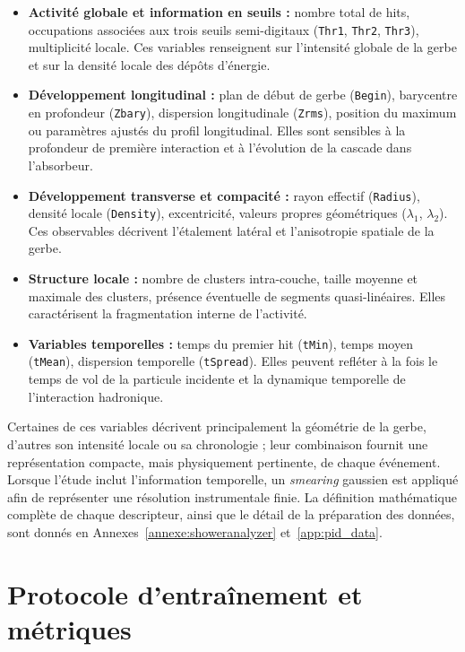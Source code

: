 \begin{itemize}
    \item \textbf{Activité globale et information en seuils :} nombre total de hits, occupations associées aux trois seuils semi-digitaux (\texttt{Thr1}, \texttt{Thr2}, \texttt{Thr3}), multiplicité locale. Ces variables renseignent sur l'intensité globale de la gerbe et sur la densité locale des dépôts d'énergie.

    \item \textbf{Développement longitudinal :} plan de début de gerbe (\texttt{Begin}), barycentre en profondeur (\texttt{Zbary}), dispersion longitudinale (\texttt{Zrms}), position du maximum ou paramètres ajustés du profil longitudinal. Elles sont sensibles à la profondeur de première interaction et à l'évolution de la cascade dans l'absorbeur.

    \item \textbf{Développement transverse et compacité :} rayon effectif (\texttt{Radius}), densité locale (\texttt{Density}), excentricité, valeurs propres géométriques (\(\lambda_1\), \(\lambda_2\)). Ces observables décrivent l'étalement latéral et l'anisotropie spatiale de la gerbe.

    \item \textbf{Structure locale :} nombre de clusters intra-couche, taille moyenne et maximale des clusters, présence éventuelle de segments quasi-linéaires. Elles caractérisent la fragmentation interne de l'activité.

    \item \textbf{Variables temporelles :} temps du premier hit (\texttt{tMin}), temps moyen (\texttt{tMean}), dispersion temporelle (\texttt{tSpread}). Elles peuvent refléter à la fois le temps de vol de la particule incidente et la dynamique temporelle de l'interaction hadronique.
\end{itemize}

Certaines de ces variables décrivent principalement la géométrie de la gerbe, d'autres son intensité locale ou sa chronologie ; leur combinaison fournit une représentation compacte, mais physiquement pertinente, de chaque événement. Lorsque l'étude inclut l'information temporelle, un \emph{smearing} gaussien est appliqué afin de représenter une résolution instrumentale finie. La définition mathématique complète de chaque descripteur, ainsi que le détail de la préparation des données, sont donnés en Annexes~\ref{annexe:showeranalyzer} et~\ref{app:pid_data}.

\section{Protocole d'entraînement et métriques}
\label{sec:pid-protocole}

